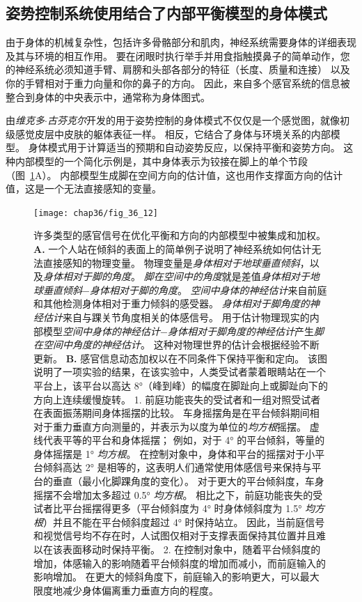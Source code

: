 \subsection{姿势控制系统使用结合了内部平衡模型的身体模式}

由于身体的机械复杂性，包括许多骨骼部分和肌肉，神经系统需要身体的详细表现及其与环境的相互作用。
要在闭眼时执行举手并用食指触摸鼻子的简单动作，您的神经系统必须知道手臂、肩膀和头部各部分的特征（长度、质量和连接） 以及你的手臂相对于重力向量和你的鼻子的方向。
因此，来自多个感官系统的信息被整合到身体的中央表示中，通常称为身体图式。


由\textit{维克多$\cdot$古芬克尔}开发的用于姿势控制的身体模式不仅仅是一个感觉图，就像初级感觉皮层中皮肤的躯体表征一样。
相反，它结合了身体与环境关系的内部模型。
身体模式用于计算适当的预期和自动姿势反应，以保持平衡和姿势方向。
这种内部模型的一个简化示例是，其中身体表示为铰接在脚上的单个节段（图~\ref{fig:36_12}A）。
内部模型生成脚在空间方向的估计值，这也用作支撑面方向的估计值，这是一个无法直接感知的变量。


\begin{figure}[htbp]
	\centering
	\texttt{[image: chap36/fig\_36\_12]}
	\caption{许多类型的感官信号在优化平衡和方向的内部模型中被集成和加权\cite{peterka2002sensorimotor}。
		\textbf{A.} 一个人站在倾斜的表面上的简单例子说明了神经系统如何估计无法直接感知的物理变量。
		物理变量是\textit{身体相对于地球垂直倾斜}，以及\textit{身体相对于脚的角度}。
		\textit{脚在空间中的角度}就是差值\textit{身体相对于地球垂直倾斜}−\textit{身体相对于脚的角度}。
		\textit{空间中身体的神经估计}来自前庭和其他检测身体相对于重力倾斜的感受器。
		\textit{身体相对于脚角度的神经估计}来自与踝关节角度相关的体感信号。
		用于估计物理现实的内部模型\textit{空间中身体的神经估计}−\textit{身体相对于脚角度的神经估计}产生\textit{脚在空间中角度的神经估计}。
		这种对物理世界的估计会根据经验不断更新。
		\textbf{B.} 感官信息动态加权以在不同条件下保持平衡和定向。
		该图说明了一项实验的结果，在该实验中，人类受试者蒙着眼睛站在一个平台上，该平台以高达 8°（峰到峰）的幅度在脚趾向上或脚趾向下的方向上连续缓慢旋转。
		1. 前庭功能丧失的受试者和一组对照受试者在表面振荡期间身体摇摆的比较。
		车身摇摆角是在平台倾斜期间相对于重力垂直方向测量的，并表示为以度为单位的\textit{均方根}摇摆。
		虚线代表平等的平台和身体摇摆；
		例如，对于 4° 的平台倾斜，等量的身体摇摆是 1° \textit{均方根}。
		在控制对象中，身体和平台的摇摆对于小平台倾斜高达 2° 是相等的，这表明人们通常使用体感信号来保持与平台的垂直（最小化脚踝角度的变化）。
		对于更大的平台倾斜度，车身摇摆不会增加太多超过 0.5° \textit{均方根}。
		相比之下，前庭功能丧失的受试者比平台摇摆得更多（平台倾斜度为 4° 时身体倾斜度为 1.5° \textit{均方根}）并且不能在平台倾斜度超过 4° 时保持站立。
		因此，当前庭信号和视觉信号均不存在时，人试图仅相对于支撑表面保持其位置并且难以在该表面移动时保持平衡。
		2. 在控制对象中，随着平台倾斜度的增加，体感输入的影响随着平台倾斜度的增加而减小，而前庭输入的影响增加。
		在更大的倾斜角度下，前庭输入的影响更大，可以最大限度地减少身体偏离重力垂直方向的程度。}
	\label{fig:36_12}
\end{figure}


